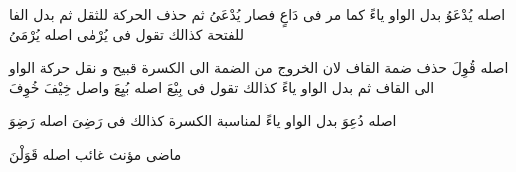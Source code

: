 \begin{twocol}
\begin{leftcol}
اصله يُدْعَوُ بدل الواو ياءً كما مر فى دَاعٍ فصار يُدْعَىُ ثم حذف الحركة للثقل ثم بدل الفا للفتحة كذالك تقول فى يُرْمٰى اصله يُرْمَىُ
\par
{}
اصله قُوِلَ حذف ضمة القاف لان الخروج من الضمة الى الكسرة قبيح و نقل حركة الواو الى القاف ثم بدل الواو ياءً كذالك تقول فى بِيْعَ اصله بُيِعَ واصل خِيْفَ خُوِفَ
\par
{}
اصله دُعِوَ بدل الواو ياءً لمناسبة الكسرة كذالك فى رَضِىَ اصله رَضِوَ
\par
{}
ماضى مؤنث غائب اصله قَوَلْنَ
\end{leftcol}
\end{twocol}
